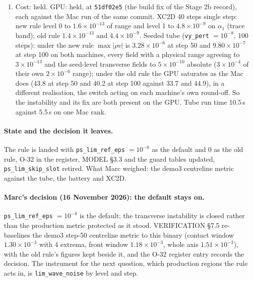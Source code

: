 \documentclass[11pt,a4paper]{article}
\newcommand{\code}[1]{\texttt{\small #1}}
\begin{document}
\begin{enumerate}[nosep]
      better solution or a smoother-looking artefact of random
      corrections is not something this metric can say; the
      independent instruments (battery, XC2D against the uniform
      reference) do not move.
\item Cost: held.  GPU: held, at \code{51df02e5} (the build fix of the
      Stage 2b record), each against the Mac run of the same commit.
      XC2D 40 steps single step: new rule level 0 to
      $1.6\times10^{-13}$ of range and level 1 to $4.8\times10^{-9}$ on
      $\alpha_1$ (trace band); old rule $1.4\times10^{-13}$ and
      $4.4\times10^{-9}$.  Seeded tube (\code{vy\_pert} $=10^{-8}$,
      100 steps): under the new rule $\max|\rho v|$ is
      $3.28\times10^{-6}$ at step 50 and $9.80\times10^{-7}$ at step
      100 on both machines, every field with a physical range agreeing
      to $3\times10^{-13}$ and the seed-level transverse fields to
      $5\times10^{-10}$ absolute ($3\times10^{-4}$ of their own
      $2\times10^{-6}$ range); under the old rule the GPU saturates as
      the Mac does (43.8 at step 50 and 40.2 at step 100 against 33.7
      and 44.9), in a different realisation, the switch acting on each
      machine's own round-off.  So the instability and its fix are both
      present on the GPU.  Tube run time 10.5\,s against 5.5\,s on one
      Mac rank.
\end{enumerate}

\paragraph{State and the decision it leaves.}  The rule is landed with
\code{ps\_lim\_ref\_eps} $= 10^{-8}$ as the default and 0 as the old rule,
O-32 in the register, MODEL \S3.3 and the guard tables updated,
\code{ps\_lim\_skip\_slot} retired.  What Marc weighed: the demo3
centreline metric against the tube, the battery and XC2D.

\paragraph{Marc's decision (16 November 2026): the default stays on.}
\code{ps\_lim\_ref\_eps} $= 10^{-8}$ is the default; the transverse
instability is closed rather than the production metric protected as it
stood.  VERIFICATION \S7.5 re-baselines the demo3 step-50 centreline
metric to this binary (contact window $1.30\times10^{-3}$ with 4
extrema, front window $1.18\times10^{-3}$, whole axis
$1.51\times10^{-3}$), with the old rule's figures kept beside it, and
the O-32 register entry records the decision.  The instrument for the
next question, which production regions the rule acts in, is
\code{lim\_wave\_noise} by level and step.
\end{document}
